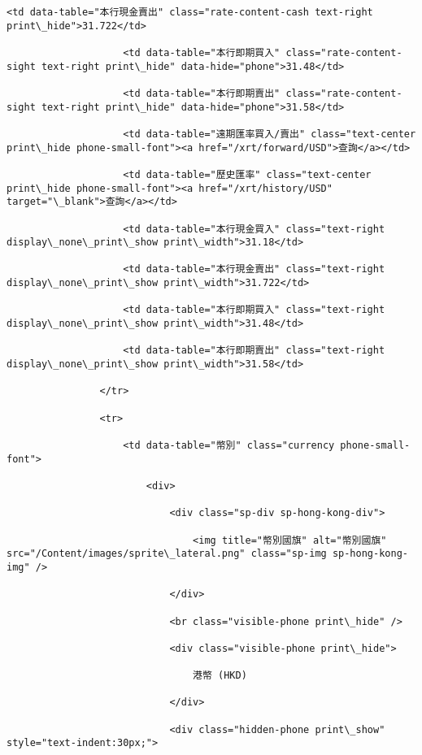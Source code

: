 \documentclass[11pt]{article}
\begin{document}
\begin{Verbatim}[commandchars=\\\{\}]
                    <td data-table="本行現金賣出" class="rate-content-cash text-right print\_hide">31.722</td>

                    <td data-table="本行即期買入" class="rate-content-sight text-right print\_hide" data-hide="phone">31.48</td>

                    <td data-table="本行即期賣出" class="rate-content-sight text-right print\_hide" data-hide="phone">31.58</td>

                    <td data-table="遠期匯率買入/賣出" class="text-center print\_hide phone-small-font"><a href="/xrt/forward/USD">查詢</a></td>

                    <td data-table="歷史匯率" class="text-center print\_hide phone-small-font"><a href="/xrt/history/USD" target="\_blank">查詢</a></td>

                    <td data-table="本行現金買入" class="text-right display\_none\_print\_show print\_width">31.18</td>

                    <td data-table="本行現金賣出" class="text-right display\_none\_print\_show print\_width">31.722</td>

                    <td data-table="本行即期買入" class="text-right display\_none\_print\_show print\_width">31.48</td>

                    <td data-table="本行即期賣出" class="text-right display\_none\_print\_show print\_width">31.58</td>

                </tr>

                <tr>

                    <td data-table="幣別" class="currency phone-small-font">

                        <div>

                            <div class="sp-div sp-hong-kong-div">

                                <img title="幣別國旗" alt="幣別國旗" src="/Content/images/sprite\_lateral.png" class="sp-img sp-hong-kong-img" />

                            </div>

                            <br class="visible-phone print\_hide" />

                            <div class="visible-phone print\_hide">

                                港幣 (HKD)

                            </div>

                            <div class="hidden-phone print\_show" style="text-indent:30px;">


\end{Verbatim}
\end{document}
